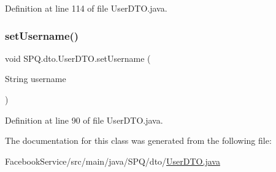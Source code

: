 Definition at line 114 of file User\+D\+T\+O.\+java.

\mbox{\label{class_s_p_q_1_1dto_1_1_user_d_t_o_a53003074966a77e89f5900344ab79b15}} 
\subsubsection{\texorpdfstring{set\+Username()}{setUsername()}}
{\footnotesize\ttfamily void S\+P\+Q.\+dto.\+User\+D\+T\+O.\+set\+Username (\begin{DoxyParamCaption}\item[{String}]{username }\end{DoxyParamCaption})}



Definition at line 90 of file User\+D\+T\+O.\+java.



The documentation for this class was generated from the following file\+:\begin{DoxyCompactItemize}
\item 
Facebook\+Service/src/main/java/\+S\+P\+Q/dto/\mbox{\hyperlink{_facebook_service_2src_2main_2java_2_s_p_q_2dto_2_user_d_t_o_8java}{User\+D\+T\+O.\+java}}\end{DoxyCompactItemize}
